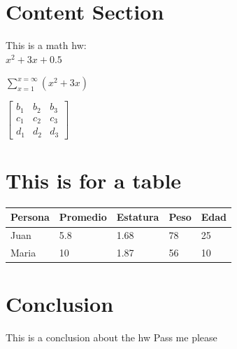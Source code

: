 \documentclass[a4paper, 12pt]{article} %
\begin{document}

\section{Content Section} %
This is a math hw:\\

$x^2 + 3x + 0.5$

$\sum_{x=1}^{x=\infty} (x^2  + 3x)$

 $
\begin{bmatrix}
b_1 & b_2 & b_3\\
c_1 & c_2 & c_3\\
d_1 & d_2 & d_3
\end{bmatrix}
$

\section{This is for a table}

\begin{table}[H]
	\begin{center}
		\begin{tabular}{|l|l|l|l|l|}
		\hline
		\textbf{Persona} & \textbf{Promedio} & \textbf{Estatura} & \textbf{Peso} & \textbf{Edad} \\ \hline
		\color{blue}Juan\color{black}    & 5.8      & 1.68     & 78   & 25   \\ \hline
		\color{red}Maria   & 10       & 1.87     & 56   & 10   \\ \hline
	\end{tabular}
	\end{center}
\end{table}


\section{Conclusion} %
\color{blue} This is a conclusion about the hw \color{black} Pass me please



\end{document}
